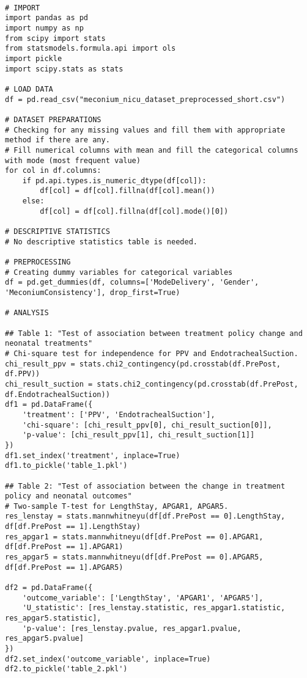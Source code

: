 \documentclass[11pt]{article}
\begin{document}
\begin{verbatim}

# IMPORT
import pandas as pd
import numpy as np
from scipy import stats
from statsmodels.formula.api import ols
import pickle
import scipy.stats as stats

# LOAD DATA
df = pd.read_csv("meconium_nicu_dataset_preprocessed_short.csv")

# DATASET PREPARATIONS
# Checking for any missing values and fill them with appropriate method if there are any.
# Fill numerical columns with mean and fill the categorical columns with mode (most frequent value)
for col in df.columns:
    if pd.api.types.is_numeric_dtype(df[col]):
        df[col] = df[col].fillna(df[col].mean())
    else:
        df[col] = df[col].fillna(df[col].mode()[0])

# DESCRIPTIVE STATISTICS 
# No descriptive statistics table is needed.

# PREPROCESSING
# Creating dummy variables for categorical variables
df = pd.get_dummies(df, columns=['ModeDelivery', 'Gender', 'MeconiumConsistency'], drop_first=True)

# ANALYSIS

## Table 1: "Test of association between treatment policy change and neonatal treatments"
# Chi-square test for independence for PPV and EndotrachealSuction.
chi_result_ppv = stats.chi2_contingency(pd.crosstab(df.PrePost, df.PPV))
chi_result_suction = stats.chi2_contingency(pd.crosstab(df.PrePost, df.EndotrachealSuction))
df1 = pd.DataFrame({
    'treatment': ['PPV', 'EndotrachealSuction'],
    'chi-square': [chi_result_ppv[0], chi_result_suction[0]],
    'p-value': [chi_result_ppv[1], chi_result_suction[1]]
})
df1.set_index('treatment', inplace=True)
df1.to_pickle('table_1.pkl')

## Table 2: "Test of association between the change in treatment policy and neonatal outcomes"
# Two-sample T-test for LengthStay, APGAR1, APGAR5.
res_lenstay = stats.mannwhitneyu(df[df.PrePost == 0].LengthStay, df[df.PrePost == 1].LengthStay)
res_apgar1 = stats.mannwhitneyu(df[df.PrePost == 0].APGAR1, df[df.PrePost == 1].APGAR1)
res_apgar5 = stats.mannwhitneyu(df[df.PrePost == 0].APGAR5, df[df.PrePost == 1].APGAR5)

df2 = pd.DataFrame({
    'outcome_variable': ['LengthStay', 'APGAR1', 'APGAR5'],
    'U_statistic': [res_lenstay.statistic, res_apgar1.statistic, res_apgar5.statistic],
    'p-value': [res_lenstay.pvalue, res_apgar1.pvalue, res_apgar5.pvalue]
})
df2.set_index('outcome_variable', inplace=True)
df2.to_pickle('table_2.pkl')


\end{verbatim}
\end{document}
